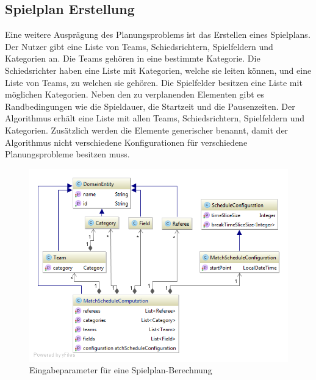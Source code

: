 %
%
%
%

\subsection{Spielplan Erstellung}
Eine weitere Ausprägung des Planungsproblems ist das Erstellen eines Spielplans. Der Nutzer gibt eine Liste von Teams, Schiedsrichtern, Spielfeldern und Kategorien an. Die Teams gehören in 
eine bestimmte Kategorie. Die Schiedsrichter haben eine Liste mit Kategorien, welche sie leiten können, und eine Liste von Teams, zu welchen sie gehören. Die Spielfelder besitzen eine Liste mit 
möglichen Kategorien. Neben den zu verplanenden Elementen gibt es Randbedingungen wie die Spieldauer, die Startzeit und die Pausenzeiten. Der Algorithmus erhält eine 
Liste mit allen Teams, Schiedsrichtern, Spielfeldern und Kategorien. Zusätzlich werden die Elemente generischer benannt, damit der Algorithmus nicht verschiedene Konfigurationen für 
verschiedene Planungsprobleme besitzen muss.

\begin{figure}[h]
\centering
\includegraphics[scale=0.5]{images/probleme/matchSchedule.png}
\caption[Eingabeparameter für eine Spielplan-Berechnung]{Eingabeparameter für eine Spielplan-Berechnung \selfmade{}}
\label{fig:matchschedule_input}
\end{figure}


